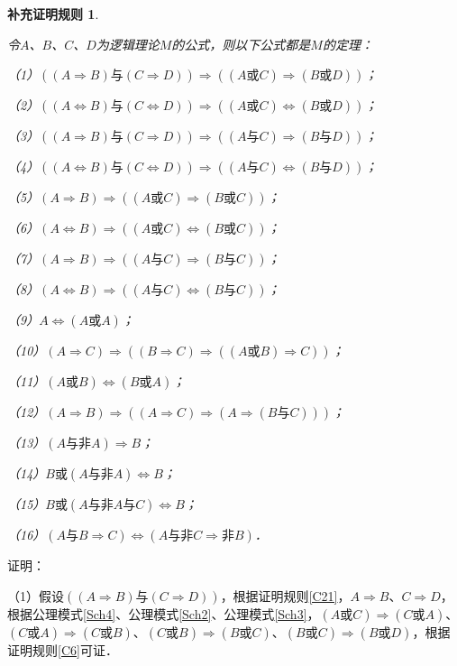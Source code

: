\documentclass[12pt, a4paper, oneside]{book}
\newtheorem{Ccor}{补充证明规则}
\begin{document}
			\begin{Ccor}\label{Ccor5}
				\hfill\par
				令$A$、$B$、$C$、$D$为逻辑理论$M$的公式，则以下公式都是$M$的定理：
				\par
				（1）$((A\Rightarrow B)\text{与}(C\Rightarrow D))\Rightarrow ((A\text{或}C)\Rightarrow (B\text{或}D))$；
				\par
				（2）$((A\Leftrightarrow B)\text{与}(C\Leftrightarrow D))\Rightarrow ((A\text{或}C)\Leftrightarrow (B\text{或}D))$；
				\par
				（3）$((A\Rightarrow B)\text{与}(C\Rightarrow D))\Rightarrow ((A\text{与}C)\Rightarrow (B\text{与}D))$；
				\par
				（4）$((A\Leftrightarrow B)\text{与}(C\Leftrightarrow D))\Rightarrow ((A\text{与}C)\Leftrightarrow (B\text{与}D))$；
				\par
				（5）$(A\Rightarrow B)\Rightarrow ((A\text{或}C)\Rightarrow (B\text{或}C))$；
				\par
				（6）$(A\Leftrightarrow B)\Rightarrow ((A\text{或}C)\Leftrightarrow (B\text{或}C))$；
				\par
				（7）$(A\Rightarrow B)\Rightarrow ((A\text{与}C)\Rightarrow (B\text{与}C))$；
				\par
				（8）$(A\Leftrightarrow B)\Rightarrow ((A\text{与}C)\Leftrightarrow (B\text{与}C))$；
				\par
				（9）$A\Leftrightarrow (A\text{或}A)$；
				\par
				（10）$(A\Rightarrow C)\Rightarrow ((B\Rightarrow C)\Rightarrow ((A\text{或}B)\Rightarrow C))$；
				\par
				（11）$(A\text{或}B)\Leftrightarrow (B\text{或}A)$；
				\par
				（12）$(A\Rightarrow B)\Rightarrow ((A\Rightarrow C)\Rightarrow (A\Rightarrow (B\text{与}C)))$；
				\par
				（13）$(A\text{与}\text{非}A)\Rightarrow B$；
				\par
				（14）$B\text{或}(A\text{与}\text{非}A)\Leftrightarrow B$；
				\par
				（15）$B\text{或}(A\text{与}\text{非}A\text{与}C)\Leftrightarrow B$；
				\par
				（16）$(A\text{与}B\Rightarrow C)\Leftrightarrow (A\text{与}\text{非}C\Rightarrow \text{非}B)$．
			\end{Ccor}
			证明：
			\par
			（1）$假设((A\Rightarrow B)\text{与}(C\Rightarrow D))$，根据证明规则\ref{C21}，$A\Rightarrow B$、$C\Rightarrow D$，根据公理模式\ref{Sch4}、公理模式\ref{Sch2}、公理模式\ref{Sch3}，$(A\text{或}C)\Rightarrow (C\text{或}A)$、$(C\text{或}A)\Rightarrow (C\text{或}B)$、$(C\text{或}B)\Rightarrow (B\text{或}C)$、$(B\text{或}C)\Rightarrow (B\text{或}D)$，根据证明规则\ref{C6}可证．
\end{document}
